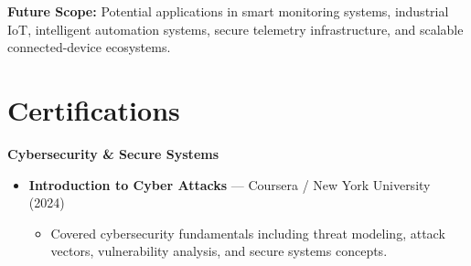 \documentclass[a4paper,11pt]{article}
\begin{document}
\textbf{Future Scope:}
Potential applications in smart monitoring systems, industrial IoT, intelligent automation systems, secure telemetry infrastructure, and scalable connected-device ecosystems.









\section{Certifications}

\textbf{Cybersecurity \& Secure Systems}
\begin{itemize}
    \item \textbf{Introduction to Cyber Attacks} --- Coursera / New York University (2024)
    
    \begin{itemize}
        \item Covered cybersecurity fundamentals including threat modeling, attack vectors, vulnerability analysis, and secure systems concepts.
    \end{itemize}
\end{itemize}

\vspace{3pt}
\end{document}
